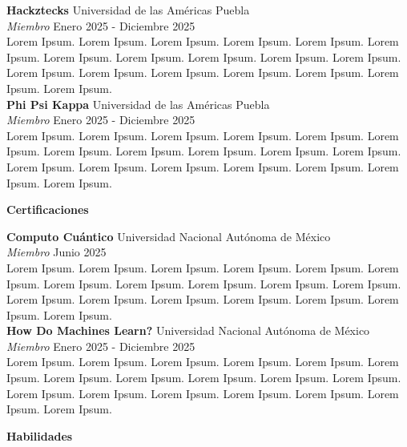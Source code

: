 \documentclass[8pt]{extarticle} %
\begin{document}
\textbf{Hackztecks} \hfill Universidad de las Américas Puebla\\
\textit{Miembro} \hfill Enero 2025 - Diciembre 2025 \\
Lorem Ipsum. Lorem Ipsum. Lorem Ipsum. Lorem Ipsum. Lorem Ipsum. Lorem Ipsum. Lorem Ipsum. Lorem Ipsum. Lorem Ipsum. Lorem Ipsum. Lorem Ipsum. Lorem Ipsum. Lorem Ipsum. Lorem Ipsum. Lorem Ipsum. Lorem Ipsum. Lorem Ipsum. Lorem Ipsum.\\

\textbf{Phi Psi Kappa} \hfill Universidad de las Américas Puebla\\
\textit{Miembro} \hfill Enero 2025 - Diciembre 2025 \\
Lorem Ipsum. Lorem Ipsum. Lorem Ipsum. Lorem Ipsum. Lorem Ipsum. Lorem Ipsum. Lorem Ipsum. Lorem Ipsum. Lorem Ipsum. Lorem Ipsum. Lorem Ipsum. Lorem Ipsum. Lorem Ipsum. Lorem Ipsum. Lorem Ipsum. Lorem Ipsum. Lorem Ipsum. Lorem Ipsum.\\



\begin{center}
\vspace{1ex}
\textbf{Certificaciones}
\vspace{-1ex}
\end{center}

\textbf{Computo Cuántico} \hfill Universidad Nacional Autónoma de México\\
\textit{Miembro} \hfill Junio 2025\\
Lorem Ipsum. Lorem Ipsum. Lorem Ipsum. Lorem Ipsum. Lorem Ipsum. Lorem Ipsum. Lorem Ipsum. Lorem Ipsum. Lorem Ipsum. Lorem Ipsum. Lorem Ipsum. Lorem Ipsum. Lorem Ipsum. Lorem Ipsum. Lorem Ipsum. Lorem Ipsum. Lorem Ipsum. Lorem Ipsum.\\

\textbf{How Do Machines Learn?} \hfill Universidad Nacional Autónoma de México \\
\textit{Miembro} \hfill Enero 2025 - Diciembre 2025\\
Lorem Ipsum. Lorem Ipsum. Lorem Ipsum. Lorem Ipsum. Lorem Ipsum. Lorem Ipsum. Lorem Ipsum. Lorem Ipsum. Lorem Ipsum. Lorem Ipsum. Lorem Ipsum. Lorem Ipsum. Lorem Ipsum. Lorem Ipsum. Lorem Ipsum. Lorem Ipsum. Lorem Ipsum. Lorem Ipsum. \\


\begin{center}  
    \vspace{1ex}  
    \textbf{Habilidades} 
    \vspace{-1ex}  
\end{center}
\end{document}

